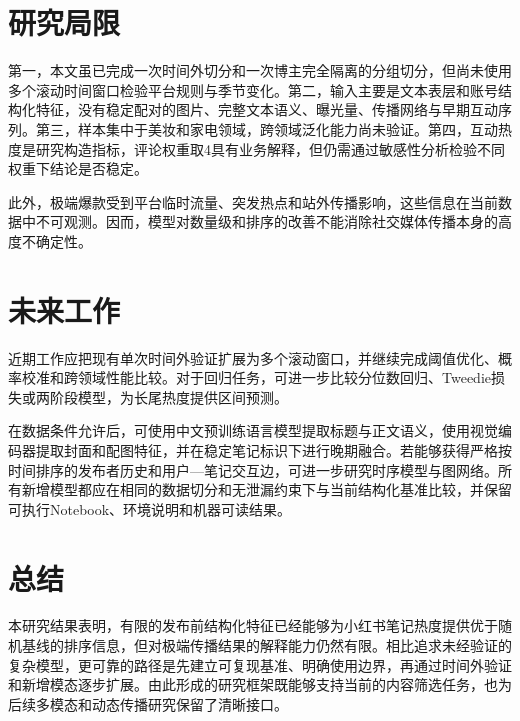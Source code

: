 \section{研究局限}
第一，本文虽已完成一次时间外切分和一次博主完全隔离的分组切分，但尚未使用多个滚动时间窗口检验平台规则与季节变化。第二，输入主要是文本表层和账号结构化特征，没有稳定配对的图片、完整文本语义、曝光量、传播网络与早期互动序列。第三，样本集中于美妆和家电领域，跨领域泛化能力尚未验证。第四，互动热度是研究构造指标，评论权重取4具有业务解释，但仍需通过敏感性分析检验不同权重下结论是否稳定。

此外，极端爆款受到平台临时流量、突发热点和站外传播影响，这些信息在当前数据中不可观测。因而，模型对数量级和排序的改善不能消除社交媒体传播本身的高度不确定性。

\section{未来工作}
近期工作应把现有单次时间外验证扩展为多个滚动窗口，并继续完成阈值优化、概率校准和跨领域性能比较。对于回归任务，可进一步比较分位数回归、Tweedie损失或两阶段模型，为长尾热度提供区间预测。

在数据条件允许后，可使用中文预训练语言模型提取标题与正文语义，使用视觉编码器提取封面和配图特征，并在稳定笔记标识下进行晚期融合。若能够获得严格按时间排序的发布者历史和用户---笔记交互边，可进一步研究时序模型与图网络。所有新增模型都应在相同的数据切分和无泄漏约束下与当前结构化基准比较，并保留可执行Notebook、环境说明和机器可读结果。

\section{总结}
本研究结果表明，有限的发布前结构化特征已经能够为小红书笔记热度提供优于随机基线的排序信息，但对极端传播结果的解释能力仍然有限。相比追求未经验证的复杂模型，更可靠的路径是先建立可复现基准、明确使用边界，再通过时间外验证和新增模态逐步扩展。由此形成的研究框架既能够支持当前的内容筛选任务，也为后续多模态和动态传播研究保留了清晰接口。
